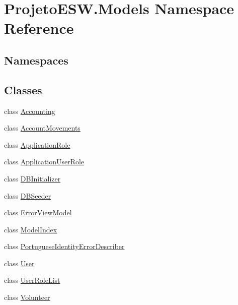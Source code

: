 \hypertarget{namespace_projeto_e_s_w_1_1_models}{}\section{Projeto\+E\+S\+W.\+Models Namespace Reference}
\label{namespace_projeto_e_s_w_1_1_models}
\subsection*{Namespaces}
\begin{DoxyCompactItemize}
\end{DoxyCompactItemize}
\subsection*{Classes}
\begin{DoxyCompactItemize}
\item 
class \mbox{\hyperlink{class_projeto_e_s_w_1_1_models_1_1_accounting}{Accounting}}
\item 
class \mbox{\hyperlink{class_projeto_e_s_w_1_1_models_1_1_account_movements}{Account\+Movements}}
\item 
class \mbox{\hyperlink{class_projeto_e_s_w_1_1_models_1_1_application_role}{Application\+Role}}
\item 
class \mbox{\hyperlink{class_projeto_e_s_w_1_1_models_1_1_application_user_role}{Application\+User\+Role}}
\item 
class \mbox{\hyperlink{class_projeto_e_s_w_1_1_models_1_1_d_b_initializer}{D\+B\+Initializer}}
\item 
class \mbox{\hyperlink{class_projeto_e_s_w_1_1_models_1_1_d_b_seeder}{D\+B\+Seeder}}
\item 
class \mbox{\hyperlink{class_projeto_e_s_w_1_1_models_1_1_error_view_model}{Error\+View\+Model}}
\item 
class \mbox{\hyperlink{class_projeto_e_s_w_1_1_models_1_1_model_index}{Model\+Index}}
\item 
class \mbox{\hyperlink{class_projeto_e_s_w_1_1_models_1_1_portuguese_identity_error_describer}{Portuguese\+Identity\+Error\+Describer}}
\item 
class \mbox{\hyperlink{class_projeto_e_s_w_1_1_models_1_1_user}{User}}
\item 
class \mbox{\hyperlink{class_projeto_e_s_w_1_1_models_1_1_user_role_list}{User\+Role\+List}}
\item 
class \mbox{\hyperlink{class_projeto_e_s_w_1_1_models_1_1_volunteer}{Volunteer}}
\end{DoxyCompactItemize}
